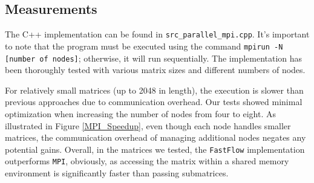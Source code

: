 \subsection*{Measurements}
The C++ implementation can be found in \texttt{src\_parallel\_mpi.cpp}. It's important to note that the program must be executed using the command \texttt{mpirun -N [number of nodes]}; otherwise, it will run sequentially. The implementation has been thoroughly tested with various matrix sizes and different numbers of nodes. 
\par For relatively small matrices (up to 2048 in length), the execution is slower than previous approaches due to communication overhead. Our tests showed minimal optimization when increasing the number of nodes from four to eight. As illustrated in Figure \ref{MPI_Speedup}, even though each node handles smaller matrices, the communication overhead of managing additional nodes negates any potential gains. Overall, in the matrices we tested, the \texttt{FastFlow} implementation outperforms \texttt{MPI}, obviously, as accessing the matrix within a shared memory environment is significantly faster than passing submatrices.

